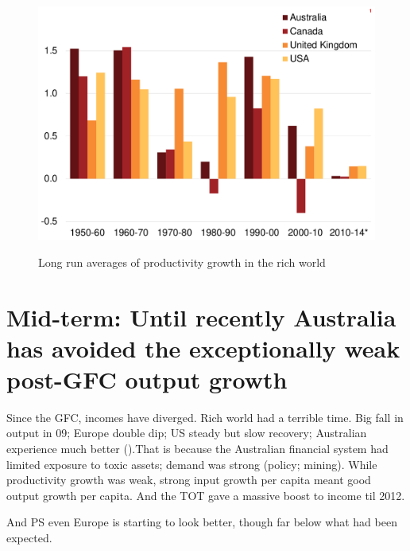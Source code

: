 \begin{figure}[p] 
 \caption{Long run averages of productivity growth in the rich world}
 \includegraphics[page=1]{atlas/Ch1.pdf}\label{fig:mfp}
\end{figure}

\section{Mid-term: Until recently Australia has avoided the exceptionally weak post-GFC output growth}

Since the GFC, incomes have diverged. Rich world had a terrible time. Big fall in output in 09; Europe double dip; US steady but slow recovery; Australian experience much better ().That is because the Australian financial system had limited exposure to toxic assets; demand was strong (policy; mining). While productivity growth was weak, strong input growth per capita meant good output growth per capita. And the TOT gave a massive boost to income til 2012.

And PS even Europe is starting to look better, though far below what had been expected. 

